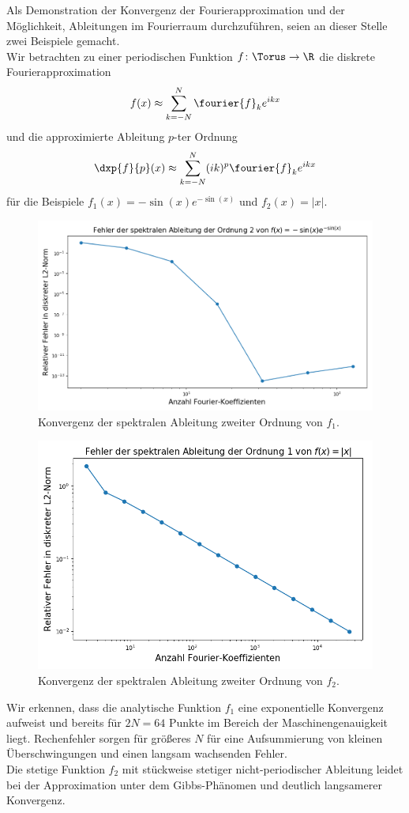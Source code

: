 \begin{mathbsp}
Als Demonstration der Konvergenz der Fourierapproximation und der Möglichkeit, Ableitungen im Fourierraum durchzuführen, seien an dieser Stelle zwei Beispiele gemacht.\\
Wir betrachten zu einer periodischen Funktion $f\colon\Torus\to\R$ die diskrete Fourierapproximation
\[f(x)\approx \sum_{k=-N}^N\fourier{f}_ke^{ikx}\]
und die approximierte Ableitung $p$-ter Ordnung
\[\dxp{f}{p}(x)\approx \sum_{k=-N}^N(ik)^p\fourier{f}_ke^{ikx}\]
für die Beispiele $f_1(x)=-\sin(x)e^{-\sin(x)}$ und $f_2(x)=|x|$.
\begin{figure}[!htb]
  \includegraphics[width=0.8\linewidth]{Figures/spectral_derivative_error_cont.png}
  \caption{Konvergenz der spektralen Ableitung zweiter Ordnung von $f_1$.}
\end{figure}
\begin{figure}[!htb]
  \includegraphics[width=0.8\linewidth]{Figures/spectral_derivative_error_discont.png}
  \caption{Konvergenz der spektralen Ableitung zweiter Ordnung von $f_2$.}
\end{figure}
Wir erkennen, dass die analytische Funktion $f_1$ eine exponentielle Konvergenz aufweist und bereits für $2N=64$ Punkte im Bereich der Maschinengenauigkeit liegt. Rechenfehler sorgen für größeres $N$ für eine Aufsummierung von kleinen Überschwingungen und einen langsam wachsenden Fehler.\\
Die stetige Funktion $f_2$ mit stückweise stetiger nicht-periodischer Ableitung leidet bei der Approximation unter dem Gibbs-Phänomen und deutlich langsamerer Konvergenz.
\end{mathbsp}

